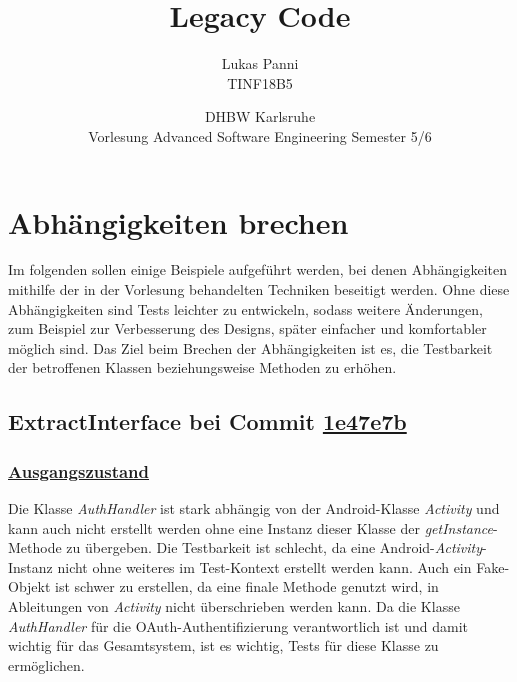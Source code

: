 \documentclass[12pt]{article}
\title{Legacy Code}
\date{DHBW Karlsruhe\\ Vorlesung Advanced Software Engineering Semester 5/6}
\author{Lukas Panni \\ TINF18B5}
\begin{document}
\maketitle

\newpage

\tableofcontents

\newpage

\section{Abhängigkeiten brechen}

Im folgenden sollen einige Beispiele aufgeführt werden, bei denen Abhängigkeiten mithilfe der in der Vorlesung behandelten Techniken beseitigt werden.
Ohne diese Abhängigkeiten sind Tests leichter zu entwickeln, sodass weitere Änderungen, zum Beispiel zur Verbesserung des Designs, später einfacher und komfortabler möglich sind.
Das Ziel beim Brechen der Abhängigkeiten ist es, die Testbarkeit der betroffenen Klassen beziehungsweise Methoden zu erhöhen.

\newpage

\subsection{ExtractInterface bei Commit \href{https://github.com/lukaspanni/OpenSourceStats/commit/1e47e7b2d42c04429a433a6ac3dbea781409d36d} {1e47e7b}}
\label{sec:ExtractInterface_AuthHandler_1}

\subsubsection*{\href{https://github.com/lukaspanni/OpenSourceStats/tree/0daf8862a81a976e3d6341f5b5461bc8d3c64b4f/app/src/main/java/de/lukaspanni/opensourcestats/auth/}{Ausgangszustand}}

Die Klasse \textit{AuthHandler} ist stark abhängig von der Android-Klasse \textit{Activity} und kann auch nicht erstellt werden ohne eine Instanz dieser Klasse der \textit{getInstance}-Methode zu übergeben.
Die Testbarkeit ist schlecht, da eine Android-\textit{Activity}-Instanz nicht ohne weiteres im Test-Kontext erstellt werden kann.
Auch ein Fake-Objekt ist schwer zu erstellen, da eine finale Methode genutzt wird, in Ableitungen von \textit{Activity} nicht überschrieben werden kann.
Da die Klasse \textit{AuthHandler} für die OAuth-Authentifizierung verantwortlich ist und damit wichtig für das Gesamtsystem, ist es wichtig, Tests für diese Klasse zu ermöglichen.
\end{document}
